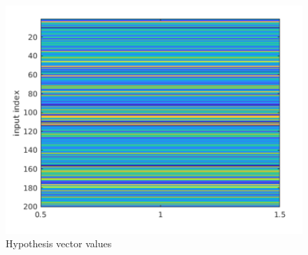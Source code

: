 \begin{figure}[!ht]
    \centering
    \includegraphics[width=1.0\textwidth]{images/chapter8/hypothesis_vector_values.png}
    \caption{Hypothesis vector values} \label{c8_Matlab_hypothesis_vector_values:fig}
\end{figure}



